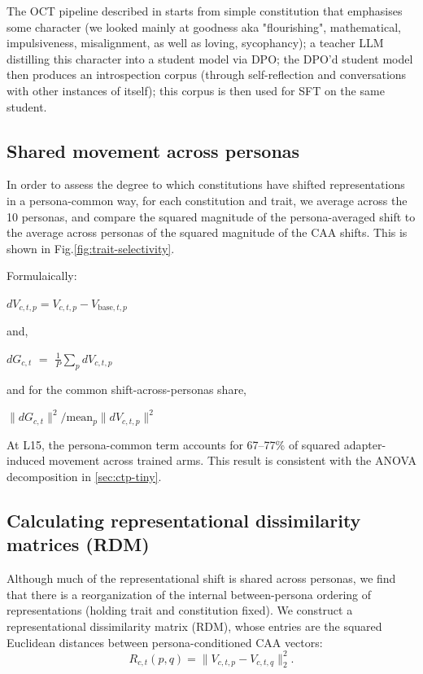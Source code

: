 \documentclass{article}
\begin{document}
The OCT pipeline described in \citet{maiya2025opencharactertrainingshaping} starts from simple constitution that emphasises some character (we looked mainly at goodness aka "flourishing", mathematical, impulsiveness, misalignment, as well as loving, sycophancy); a teacher LLM distilling this character into a student model via DPO; the DPO'd student model then produces an introspection corpus (through self-reflection and conversations with other instances of itself); this corpus is then used for SFT on the same student.

\subsection{Shared movement across personas}
\label{app:broad-shift}
In order to assess the degree to which constitutions have shifted representations in a persona-common way, for each constitution and trait, we average across the 10 personas, and compare the squared magnitude of the persona-averaged shift to the average across personas of the squared magnitude of the CAA shifts. This is shown in Fig.\ref{fig:trait-selectivity}.

Formulaically:

$dV_{c,t,p} = V_{c,t,p}-V_{\mathrm{base},t,p}$

and,

$dG_{c,t}$ $=$ $\tfrac{1}{P}\sum_{p}dV_{c,t,p}$

and for the common shift-across-personas share,

$\|dG_{c,t}\|^2\big/\mathrm{mean}_p\|dV_{c,t,p}\|^2$

At L15, the persona-common term accounts for 67--77\% of squared adapter-induced movement across trained arms. This result is consistent with the ANOVA decomposition in \ref{sec:ctp-tiny}.

\subsection{Calculating representational dissimilarity matrices (RDM)}
\label{app:rdm}
Although much of the representational shift is shared across personas, we find that there is a reorganization of the internal between-persona ordering of representations (holding trait and constitution fixed). We construct a representational dissimilarity matrix (RDM), whose entries are the squared
Euclidean distances between persona-conditioned CAA vectors:
\begin{equation}
R_{c,t}(p,q)
=
\|V_{c,t,p}-V_{c,t,q}\|_2^2.
\end{equation}
\end{document}

